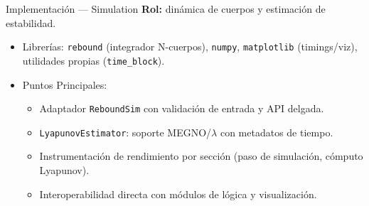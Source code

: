 \begin{frame}{Implementación — Simulation}
    \textbf{Rol:} dinámica de cuerpos y estimación de estabilidad.
    \vspace{0.2cm}
    \begin{itemize}
        \item Librerías: \texttt{rebound} (integrador N-cuerpos), \texttt{numpy}, \texttt{matplotlib} (timings/viz), utilidades propias (\texttt{time\_block}).
        \item Puntos Principales:
        \begin{itemize}
            \item Adaptador \texttt{ReboundSim} con validación de entrada y API delgada.
            \item \texttt{LyapunovEstimator}: soporte MEGNO/\(\lambda\) con metadatos de tiempo.
            \item Instrumentación de rendimiento por sección (paso de simulación, cómputo Lyapunov).
            \item Interoperabilidad directa con módulos de lógica y visualización.
        \end{itemize}
    \end{itemize}
\end{frame}

